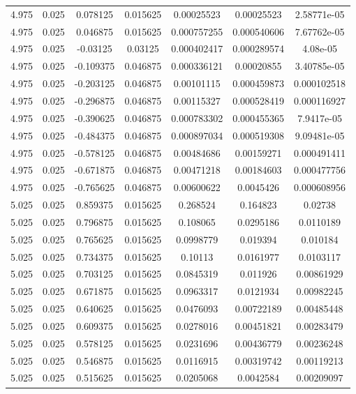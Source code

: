 \begin{flushleft}
\begin{longtable}{ccccccc}
4.975 & 0.025 & 0.078125 & 0.015625 & 0.00025523 & 0.00025523 & 2.58771e-05  \\ 
4.975 & 0.025 & 0.046875 & 0.015625 & 0.000757255 & 0.000540606 & 7.67762e-05  \\ 
4.975 & 0.025 & -0.03125 & 0.03125 & 0.000402417 & 0.000289574 & 4.08e-05  \\ 
4.975 & 0.025 & -0.109375 & 0.046875 & 0.000336121 & 0.00020855 & 3.40785e-05  \\ 
4.975 & 0.025 & -0.203125 & 0.046875 & 0.00101115 & 0.000459873 & 0.000102518  \\ 
4.975 & 0.025 & -0.296875 & 0.046875 & 0.00115327 & 0.000528419 & 0.000116927  \\ 
4.975 & 0.025 & -0.390625 & 0.046875 & 0.000783302 & 0.000455365 & 7.9417e-05  \\ 
4.975 & 0.025 & -0.484375 & 0.046875 & 0.000897034 & 0.000519308 & 9.09481e-05  \\ 
4.975 & 0.025 & -0.578125 & 0.046875 & 0.00484686 & 0.00159271 & 0.000491411  \\ 
4.975 & 0.025 & -0.671875 & 0.046875 & 0.00471218 & 0.00184603 & 0.000477756  \\ 
4.975 & 0.025 & -0.765625 & 0.046875 & 0.00600622 & 0.0045426 & 0.000608956  \\ 
5.025 & 0.025 & 0.859375 & 0.015625 & 0.268524 & 0.164823 & 0.02738  \\ 
5.025 & 0.025 & 0.796875 & 0.015625 & 0.108065 & 0.0295186 & 0.0110189  \\ 
5.025 & 0.025 & 0.765625 & 0.015625 & 0.0998779 & 0.019394 & 0.010184  \\ 
5.025 & 0.025 & 0.734375 & 0.015625 & 0.10113 & 0.0161977 & 0.0103117  \\ 
5.025 & 0.025 & 0.703125 & 0.015625 & 0.0845319 & 0.011926 & 0.00861929  \\ 
5.025 & 0.025 & 0.671875 & 0.015625 & 0.0963317 & 0.0121934 & 0.00982245  \\ 
5.025 & 0.025 & 0.640625 & 0.015625 & 0.0476093 & 0.00722189 & 0.00485448  \\ 
5.025 & 0.025 & 0.609375 & 0.015625 & 0.0278016 & 0.00451821 & 0.00283479  \\ 
5.025 & 0.025 & 0.578125 & 0.015625 & 0.0231696 & 0.00436779 & 0.00236248  \\ 
5.025 & 0.025 & 0.546875 & 0.015625 & 0.0116915 & 0.00319742 & 0.00119213  \\ 
5.025 & 0.025 & 0.515625 & 0.015625 & 0.0205068 & 0.0042584 & 0.00209097  \\ 

\end{longtable}
\end{flushleft}
